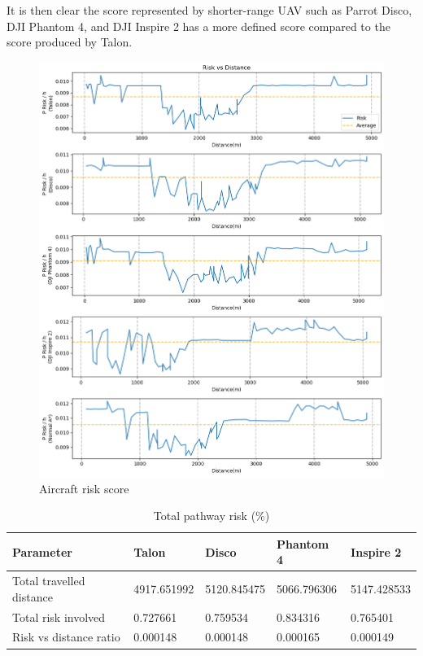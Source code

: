\documentclass[12pt]{report}
\begin{document}
        It is then clear the score represented by shorter-range UAV such as Parrot Disco, DJI Phantom 4, and DJI
        Inspire 2 has a more defined score compared to the score produced by Talon.

        \begin{figure}[H]
            \centering
            \includegraphics[width=\textwidth]{Plot/risk_vs_distance.png}
            \caption{Aircraft risk score}
        \end{figure}

        \begin{table}[H]
            \centering
            \begin{tabular}{| l  l  l  l  l |}
                \hline
                \textbf{Parameter} & \textbf{Talon} & \textbf{Disco} & \textbf{Phantom 4} & \textbf{Inspire 2} \\
                \hline
                Total travelled distance & 4917.651992 & 5120.845475 & 5066.796306 & 5147.428533 \\
                Total risk involved & 0.727661 & 0.759534 & 0.834316 & 0.765401 \\
                Risk vs distance ratio & 0.000148 & 0.000148 & 0.000165 & 0.000149 \\
                \hline
            \end{tabular}
            \caption{Total pathway risk (\%)} %
        \end{table}
\end{document}
